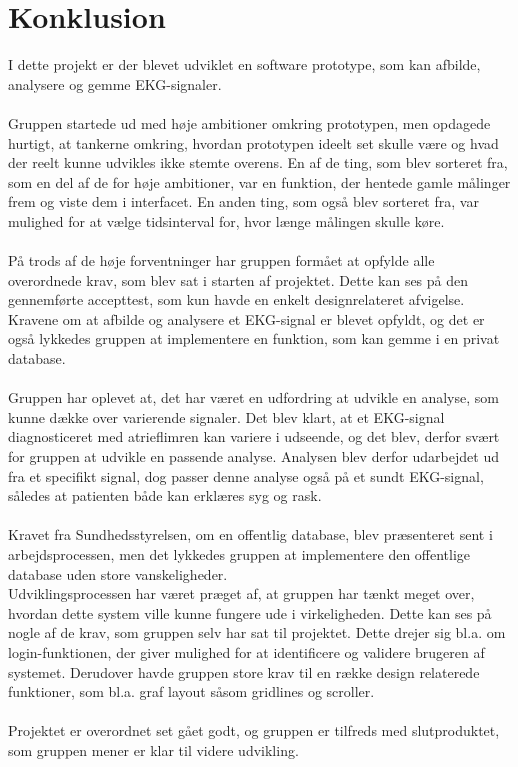 \chapter{Konklusion}
I dette projekt er der blevet udviklet en software prototype, som kan afbilde, analysere og gemme EKG-signaler. \\\\
Gruppen startede ud med høje ambitioner omkring prototypen, men opdagede hurtigt, at tankerne omkring, hvordan prototypen ideelt set skulle være og hvad der reelt kunne udvikles ikke stemte overens. En af de ting, som blev sorteret fra, som en del af de for høje ambitioner, var en funktion, der hentede gamle målinger frem og viste dem i interfacet. En anden ting, som også blev sorteret fra, var mulighed for at vælge tidsinterval for, hvor længe målingen skulle køre.\\ \\
På trods af de høje forventninger har gruppen formået at opfylde alle overordnede krav, som blev sat i starten af projektet. Dette kan ses på den gennemførte accepttest, som kun havde en enkelt designrelateret afvigelse. Kravene om at afbilde og analysere et EKG-signal er blevet opfyldt, og det er også lykkedes gruppen at implementere en funktion, som kan gemme i en privat database. \\ \\
Gruppen har oplevet at, det har været en udfordring at udvikle en analyse, som kunne dække over varierende signaler. Det blev klart, at et EKG-signal diagnosticeret med atrieflimren kan variere i udseende, og det blev, derfor svært for gruppen at udvikle en passende analyse. Analysen blev derfor udarbejdet ud fra et specifikt signal, dog passer denne analyse også på et sundt EKG-signal, således at patienten både kan erklæres syg og rask. \\ \\
Kravet fra Sundhedsstyrelsen, om en offentlig database, blev præsenteret sent i arbejdsprocessen, men det lykkedes gruppen at implementere den offentlige database uden store vanskeligheder. \\
Udviklingsprocessen har været præget af, at gruppen har tænkt meget over, hvordan dette system ville kunne fungere ude i virkeligheden. Dette kan ses på nogle af de krav, som gruppen selv har sat til projektet. Dette drejer sig bl.a. om login-funktionen, der giver mulighed for at identificere og validere brugeren af systemet. Derudover havde gruppen store krav til en række design relaterede funktioner, som bl.a. graf layout såsom gridlines og scroller.\\ \\
Projektet er overordnet set gået godt, og gruppen er tilfreds med slutproduktet, som gruppen mener er klar til videre udvikling.

